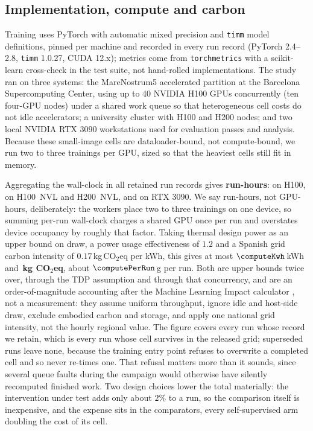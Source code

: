 \subsection{Implementation, compute and carbon}\label{sec:compute}
Training uses PyTorch with automatic mixed precision and \texttt{timm}
model definitions, pinned per machine and recorded in every run record
(PyTorch 2.4--2.8, \texttt{timm} 1.0.27, CUDA 12.x); metrics come from
\texttt{torchmetrics} with a scikit-learn cross-check in the test suite, not hand-rolled implementations. The study ran on three systems:
the MareNostrum5 accelerated partition at the Barcelona Supercomputing
Center, using up to 40 NVIDIA H100 GPUs concurrently (ten four-GPU nodes)
under a shared work queue so that heterogeneous
cell costs do not idle accelerators; a university cluster with H100 and
H200 nodes; and two local NVIDIA RTX 3090 workstations used for evaluation
passes and analysis. Because these small-image cells are dataloader-bound, not compute-bound, we run two to three trainings per GPU, sized
so that the heaviest cells still fit in memory.

Aggregating the wall-clock in all \computeRuns{} retained run records gives
\textbf{\computeGpuHours{} run-hours}: \computeHhundred{} on H100, \computeNvl{}
on H100~NVL and H200~NVL, and \computeAmpere{} on RTX 3090. We say run-hours, not GPU-hours, deliberately: the workers place two to three
trainings on one device, so summing per-run wall-clock charges a shared GPU
once per run and overstates device occupancy by roughly that factor. Taking thermal design power
as an upper bound on draw, a power usage effectiveness of $1.2$ and a Spanish
grid carbon intensity of $0.17$\,kg\,CO$_2$eq per kWh, this gives at most
$\computeKwh$\,kWh and \textbf{\computeCarbon\,kg CO$_2$eq}, about
$\computePerRun$\,g per run. Both are upper bounds twice over, through the TDP assumption and through that
concurrency, and are an order-of-magnitude accounting after the Machine
Learning Impact calculator \citep{lacoste2019quantifying}, not a measurement:
they assume uniform throughput, ignore idle and host-side draw, exclude
embodied carbon and storage, and apply one national grid intensity, not the
hourly regional value. The figure covers every run whose record we retain, which is every run whose
cell survives in the released grid; superseded runs leave none, because the
training entry point refuses to overwrite a completed cell and so never
re-times one. That refusal matters more than it sounds, since several queue
faults during the campaign would otherwise have silently recomputed finished
work. Two design choices lower the total materially: the intervention under
test adds only about $2\%$ to a run, so the comparison itself is inexpensive,
and the expense sits in the comparators, every self-supervised arm doubling
the cost of its cell.

